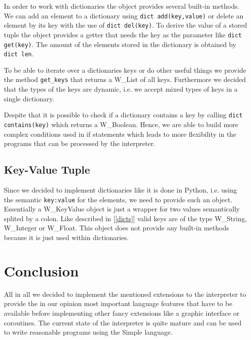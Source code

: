 \documentclass{article}
\begin{document}
In order to work with dictionaries the object provides several built-in methods.
We can add an element to a dictionary using \texttt{dict add(key,value)} or delete an element by its key with the use of \texttt{dict del(key)}.
To derive the value of a stored tuple the object provides a getter that needs the key as the parameter like \texttt{dict get(key)}.
The amount of the elements stored in the dictionary is obtained by \texttt{dict len}.

To be able to iterate over a dictionaries keys or do other useful things we provide the method \texttt{get\_keys} that returns a W\_List of all keys.
Furthermore we decided that the types of the keys are dynamic, i.e. we accept mixed types of keys in a single dictionary.

Despite that it is possible to check if a dictionary contains a key by calling \texttt{dict contains(key)} which returns a W\_Boolean.
Hence, we are able to build more complex conditions used in if statements which leads to more flexibility in the programs that can be processed by the interpreter.

\subsection{Key-Value Tuple}
Since we decided to implement dictionaries like it is done in Python, i.e. using the semantic \texttt{key:value} for the elements, we need to provide such an object.
Essentially a W\_KeyValue object is just a wrapper for two values semantically splited by a colon.
Like described in [\ref{dicts}] valid keys are of the type W\_String, W\_Integer or W\_Float.
This object does not provide any built-in methods because it is just used within dictionaries.

\section{Conclusion}
All in all we decided to implement the mentioned extensions to the interpreter to provide the in our opinion most important language features that have to be available before implementing other fancy extensions like a graphic interface or coroutines.  
The current state of the interpreter is quite mature and can be used to write reasonable programs using the Simple language.

\newpage
\end{document}
